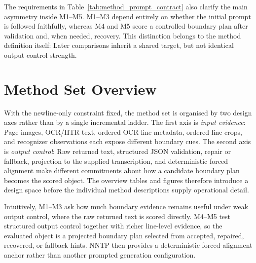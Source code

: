 The requirements in Table~\ref{tab:method_prompt_contract} also clarify the main asymmetry inside M1--M5. M1--M3 depend entirely on whether the initial prompt is followed faithfully, whereas M4 and M5 score a controlled boundary plan after validation and, when needed, recovery. This distinction belongs to the method definition itself: Later comparisons inherit a shared target, but not identical output-control strength.

\section{Method Set Overview}
\label{sec:method_overview}

With the newline-only constraint fixed, the method set is organised by two design axes rather than by a single incremental ladder. The first axis is \emph{input evidence}: Page images, OCR/HTR text, ordered OCR-line metadata, ordered line crops, and recognizer observations each expose different boundary cues. The second axis is \emph{output control}: Raw returned text, structured JSON validation, repair or fallback, projection to the supplied transcription, and deterministic forced alignment make different commitments about how a candidate boundary plan becomes the scored object. The overview tables and figures therefore introduce a design space before the individual method descriptions supply operational detail.

Intuitively, M1--M3 ask how much boundary evidence remains useful under weak output control, where the raw returned text is scored directly. M4--M5 test structured output control together with richer line-level evidence, so the evaluated object is a projected boundary plan selected from accepted, repaired, recovered, or fallback hints. NNTP then provides a deterministic forced-alignment anchor rather than another prompted generation configuration.

